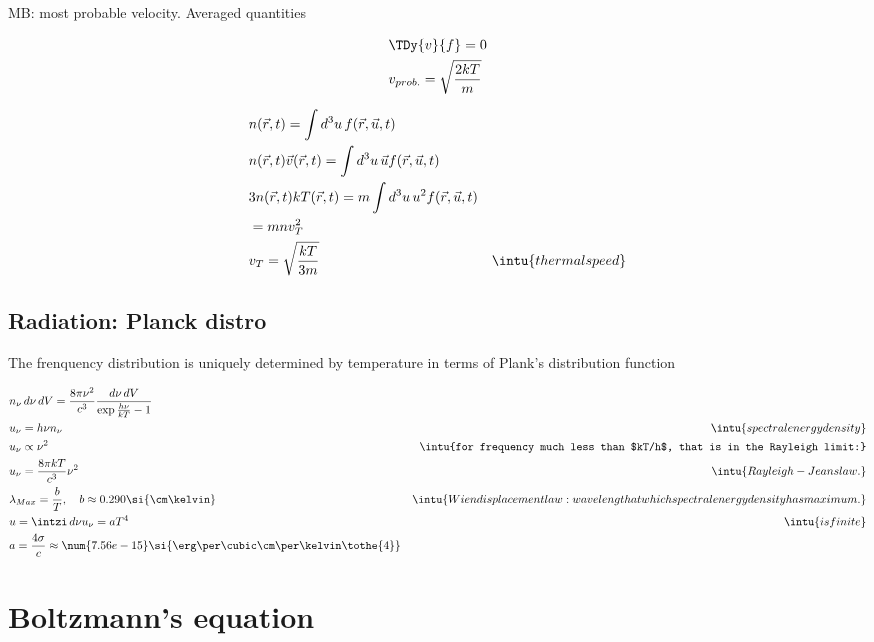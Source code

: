 \begin{usefull}{MB: most probable velocity. Averaged quantities}

\begin{align*}
&\TDy{v}{f}=0\\
&v_{prob.}=\sqrt{\frac{2kT}{m}}
\end{align*}

\begin{align*}
&n(\vec{r},t)=\int d^3u\,f(\vec{r},\vec{u},t)\\
&n(\vec{r},t)\vec{v}(\vec{r},t)=\int d^3u\,\vec{u}f(\vec{r},\vec{u},t)\\
&3n(\vec{r},t)kT(\vec{r},t)=m\int d^3u\,u^2f(\vec{r},\vec{u},t)\\
&=mnv_T^2\\
&v_T=\sqrt{\frac{kT}{3m}}&\intu{thermal speed}
\end{align*}

\end{usefull}



\subsection{Radiation: Planck distro}

The frenquency distribution is uniquely determined by temperature in terms of Plank's distribution function

\begin{align*}
&n_{\nu}\,d\nu\,dV=\frac{8\pi\nu^2}{c^3}\frac{d\nu\,dV}{\exp{\frac{h\nu}{kT}}-1}\\
&u_{\nu}=h\nu n_{\nu}&\intu{spectral energy density}\\
&u_{\nu}\propto\nu^2&\intu{for frequency much less than $kT/h$, that is in the Rayleigh limit:}\\
&u_{\nu}=\frac{8\pi kT}{c^3}\nu^2&\intu{Rayleigh-Jeans law.}\\
&\lambda_{Max}=\frac{b}{T},\quad b\approx0.290\si{\cm\kelvin}&\intu{Wien displacement law: wavelength at which spectral energy density has maximum.}\\
&u=\intzi\,d\nu u_{\nu}=aT^4&\intu{is finite}\\
&a=\frac{4\sigma}{c}\approx\num{7.56e-15}\si{\erg\per\cubic\cm\per\kelvin\tothe{4}}
\end{align*}


\section{Boltzmann's equation}

